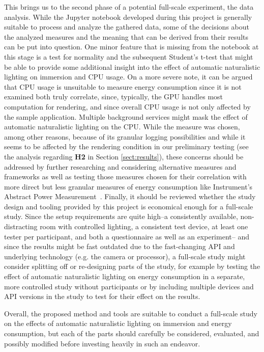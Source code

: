 \documentclass[12pt,twoside,english]{article}
\begin{document}
This brings us to the second phase of a potential full-scale experiment, the data analysis.
While the Jupyter notebook developed during this project is generally suitable to process and analyze the gathered data, some of the decisions about the analyzed measures and the meaning that can be derived from their results can be put into question.
One minor feature that is missing from the notebook at this stage is a test for normality and the subsequent Student's t-test that might be able to provide some additional insight into the effect of automatic naturalistic lighting on immersion and \gls{CPU} usage.
On a more severe note, it can be argued that \gls{CPU} usage is unsuitable to measure energy consumption since it is not examined both truly correlate, since, typically, the \gls{GPU} handles most computation for rendering, and since overall \gls{CPU} usage is not only affected by the sample application.
Multiple background services might mask the effect of automatic naturalistic lighting on the \gls{CPU}.
While the measure was chosen, among other reasons, because of its granular logging possibilities and while it seems to be affected by the rendering condition in our preliminary testing (see the analysis regarding \textbf{H2} in Section \ref{sect:results}), these concerns should be addressed by further researching and considering alternative measures and frameworks as well as testing those measures chosen for their correlation with more direct but less granular measures of energy consumption like Instrument's Abstract Power Measurement~\cite{apple_abstract_2020}.
Finally, it should be reviewed whether the study design and tooling provided by this project is economical enough for a full-scale study.
Since the setup requirements are quite high--a consistently available, non-distracting room with controlled lighting, a consistent test device, at least one tester per participant, and both a questionnaire as well as an experiment-- and since the results might be fast outdated due to the fast-changing API and underlying technology (e.g. the camera or processor), a full-scale study might consider splitting off or re-designing parts of the study, for example by testing the effect of automatic naturalistic lighting on energy consumption in a separate, more controlled study without participants or by including multiple devices and API versions in the study to test for their effect on the results.

Overall, the proposed method and tools are suitable to conduct a full-scale study on the effects of automatic naturalistic lighting on immersion and energy consumption, but each of the parts should carefully be considered, evaluated, and possibly modified before investing heavily in such an endeavor.
\end{document}
